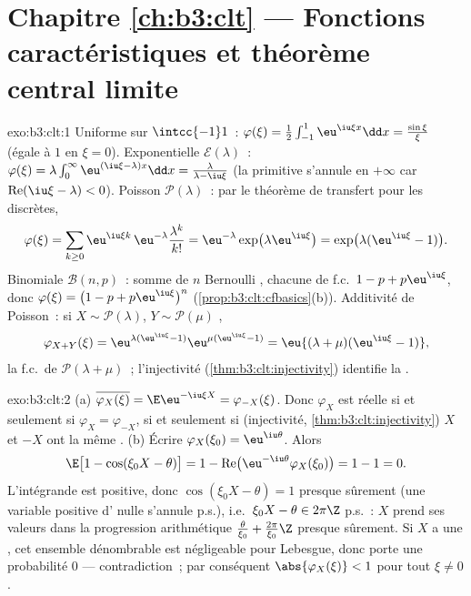 \section*{Chapitre \ref{ch:b3:clt} --- Fonctions caractéristiques
et théorème central limite}

\begin{solution}{exo:b3:clt:1}
Uniforme sur $\intcc{-1}1$~: $\varphi(\xi) =
\frac12\int_{-1}^1\eu^{\iu\xi x}\dd x =
\frac{\sin\xi}{\xi}$ (égale à $1$ en $\xi = 0$).
Exponentielle $\mathcal E(\lambda)$~: $\varphi(\xi) =
\lambda\int_0^\infty\eu^{(\iu\xi - \lambda)x}\dd x =
\frac{\lambda}{\lambda - \iu\xi}$ (la primitive s'annule en
$+\infty$ car $\operatorname{Re}(\iu\xi - \lambda) < 0$).
Poisson $\mathcal P(\lambda)$~: par le théorème de transfert
pour les  discrètes,
\[
\varphi(\xi) = \sum_{k\geq0}\eu^{\iu\xi
k}\,\eu^{-\lambda}\frac{\lambda^k}{k!}
= \eu^{-\lambda}\exp\bigl(\lambda\eu^{\iu\xi}\bigr)
= \exp\bigl(\lambda(\eu^{\iu\xi} - 1)\bigr).
\]
Binomiale $\mathcal B(n, p)$~: somme de $n$ Bernoulli
, chacune de f.c.\ $1 - p + p\eu^{\iu\xi}$,
donc $\varphi(\xi) = \bigl(1 - p + p\eu^{\iu\xi}\bigr)^n$
(\cref{prop:b3:clt:cfbasics}(b)). Additivité de Poisson~: si
$X \sim \mathcal P(\lambda)$, $Y \sim \mathcal P(\mu)$
,
\[
\varphi_{X+Y}(\xi) = \eu^{\lambda(\eu^{\iu\xi}-1)}
\eu^{\mu(\eu^{\iu\xi}-1)} =
\eu{(\lambda+\mu)(\eu^{\iu\xi}-1)},
\]
la f.c.\ de $\mathcal P(\lambda + \mu)$~; l'injectivité
(\cref{thm:b3:clt:injectivity}) identifie la .
\end{solution}

\begin{solution}{exo:b3:clt:2}
(a) $\overline{\varphi_X(\xi)} = \E\eu^{-\iu\xi X} =
\varphi_{-X}(\xi)$. Donc $\varphi_X$ est réelle si et
seulement si $\varphi_X = \varphi_{-X}$, si et seulement si
(injectivité, \cref{thm:b3:clt:injectivity}) $X$ et $-X$ ont
la même .
(b) Écrire $\varphi_X(\xi_0) = \eu^{\iu\theta}$. Alors
\[
\E\bigl[1 - \cos(\xi_0X - \theta)\bigr]
= 1 - \operatorname{Re}\bigl(\eu^{-\iu\theta}
\varphi_X(\xi_0)\bigr) = 1 - 1 = 0 .
\]
L'intégrande est positive, donc $\cos(\xi_0X - \theta) = 1$
presque sûrement (une variable positive d' nulle
s'annule p.s.), i.e.\ $\xi_0X - \theta \in 2\pi\Z$ p.s.~: $X$
prend ses valeurs dans la progression arithmétique
$\frac{\theta}{\xi_0} + \frac{2\pi}{\xi_0}\Z$ presque
sûrement. Si $X$ a une , cet ensemble dénombrable est
négligeable pour Lebesgue, donc porte une probabilité $0$ ---
contradiction~; par conséquent $\abs{\varphi_X(\xi)} < 1$ pour
tout $\xi \neq 0$.
\end{solution}

